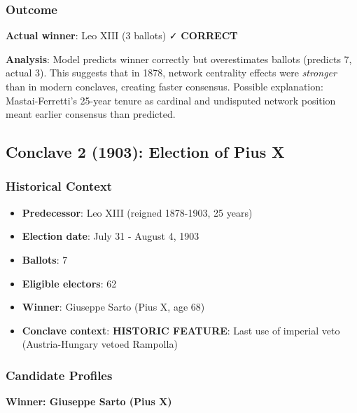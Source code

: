 \subsubsection{Outcome}

\textbf{Actual winner}: Leo XIII (3 ballots) ✓ \textbf{CORRECT}

\textbf{Analysis}: Model predicts winner correctly but overestimates ballots (predicts 7, actual 3). This suggests that in 1878, network centrality effects were \textit{stronger} than in modern conclaves, creating faster consensus. Possible explanation: Mastai-Ferretti's 25-year tenure as cardinal and undisputed network position meant earlier consensus than predicted.


\subsection{Conclave 2 (1903): Election of Pius X}

\subsubsection{Historical Context}

\begin{itemize}
    \item \textbf{Predecessor}: Leo XIII (reigned 1878-1903, 25 years)
    \item \textbf{Election date}: July 31 - August 4, 1903
    \item \textbf{Ballots}: 7
    \item \textbf{Eligible electors}: 62
    \item \textbf{Winner}: Giuseppe Sarto (Pius X, age 68)
    \item \textbf{Conclave context}: \textbf{HISTORIC FEATURE}: Last use of imperial veto (Austria-Hungary vetoed Rampolla)
\end{itemize}

\subsubsection{Candidate Profiles}

\textbf{Winner: Giuseppe Sarto (Pius X)}

